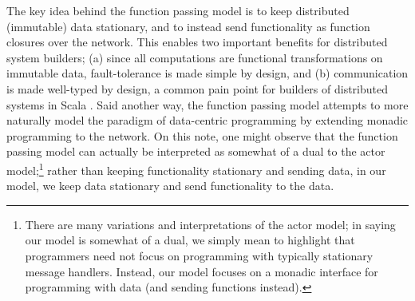 \documentclass[preprint]{sigplanconf}
\theoremstyle{definition}
\theoremstyle{definition}
\begin{document}
The key idea behind the function passing model is to keep distributed
(immutable) data stationary, and to instead send functionality as function
closures over the network. 
This enables two important benefits for distributed system builders; (a) since
all computations are functional transformations on immutable data,
fault-tolerance is made simple by design, and (b) communication is made
well-typed by design, a common pain point for builders of distributed systems in
Scala . Said another way, the function passing model
attempts to more naturally model the paradigm of data-centric programming by
extending monadic programming to the network. On this note, one might observe
that the function passing model can actually be interpreted as somewhat of a
dual to the actor model;\footnote{There are many variations and interpretations
of the actor model; in saying our model is somewhat of a dual, we simply mean to
highlight that programmers need not focus on programming with typically
stationary message handlers. Instead, our model focuses on a monadic interface
for programming with data (and sending functions instead).} rather than keeping
functionality stationary and sending data, in our model, we keep data stationary
and send functionality to the data.

\end{document}

